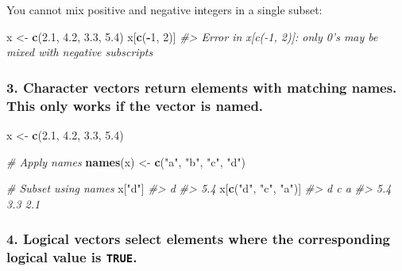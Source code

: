 \documentclass[]{book}
\newenvironment{Shaded}{\begin{snugshade}}{\end{snugshade}}
\newcommand{\KeywordTok}[1]{\textcolor[rgb]{0.13,0.29,0.53}{\textbf{#1}}}
\newcommand{\DecValTok}[1]{\textcolor[rgb]{0.00,0.00,0.81}{#1}}
\newcommand{\FloatTok}[1]{\textcolor[rgb]{0.00,0.00,0.81}{#1}}
\newcommand{\StringTok}[1]{\textcolor[rgb]{0.31,0.60,0.02}{#1}}
\newcommand{\CommentTok}[1]{\textcolor[rgb]{0.56,0.35,0.01}{\textit{#1}}}
\newcommand{\OperatorTok}[1]{\textcolor[rgb]{0.81,0.36,0.00}{\textbf{#1}}}
\newcommand{\NormalTok}[1]{#1}
\begin{document}
You cannot mix positive and negative integers in a single subset:

\begin{Shaded}
\begin{Highlighting}[]
\NormalTok{x <-}\StringTok{ }\KeywordTok{c}\NormalTok{(}\FloatTok{2.1}\NormalTok{, }\FloatTok{4.2}\NormalTok{, }\FloatTok{3.3}\NormalTok{, }\FloatTok{5.4}\NormalTok{)}
\NormalTok{x[}\KeywordTok{c}\NormalTok{(}\OperatorTok{-}\DecValTok{1}\NormalTok{, }\DecValTok{2}\NormalTok{)]}
\CommentTok{#> Error in x[c(-1, 2)]: only 0's may be mixed with negative subscripts}
\end{Highlighting}
\end{Shaded}

\subsubsection*{\texorpdfstring{3. \textbf{Character vectors} return
elements with matching names. This only works if the vector is
named.}{3. Character vectors return elements with matching names. This only works if the vector is named.}}\label{character-vectors-return-elements-with-matching-names.-this-only-works-if-the-vector-is-named.}

\begin{Shaded}
\begin{Highlighting}[]
\NormalTok{x <-}\StringTok{ }\KeywordTok{c}\NormalTok{(}\FloatTok{2.1}\NormalTok{, }\FloatTok{4.2}\NormalTok{, }\FloatTok{3.3}\NormalTok{, }\FloatTok{5.4}\NormalTok{)}

\CommentTok{# Apply names}
\KeywordTok{names}\NormalTok{(x) <-}\StringTok{ }\KeywordTok{c}\NormalTok{(}\StringTok{"a"}\NormalTok{, }\StringTok{"b"}\NormalTok{, }\StringTok{"c"}\NormalTok{, }\StringTok{"d"}\NormalTok{)}

\CommentTok{# Subset using names}
\NormalTok{x[}\StringTok{"d"}\NormalTok{]}
\CommentTok{#>   d }
\CommentTok{#> 5.4}
\NormalTok{x[}\KeywordTok{c}\NormalTok{(}\StringTok{"d"}\NormalTok{, }\StringTok{"c"}\NormalTok{, }\StringTok{"a"}\NormalTok{)]}
\CommentTok{#>   d   c   a }
\CommentTok{#> 5.4 3.3 2.1}
\end{Highlighting}
\end{Shaded}

\subsubsection*{\texorpdfstring{4. \textbf{Logical vectors} select
elements where the corresponding logical value is
\texttt{TRUE}.}{4. Logical vectors select elements where the corresponding logical value is TRUE.}}\label{logical-vectors-select-elements-where-the-corresponding-logical-value-is-true.}
\end{document}
